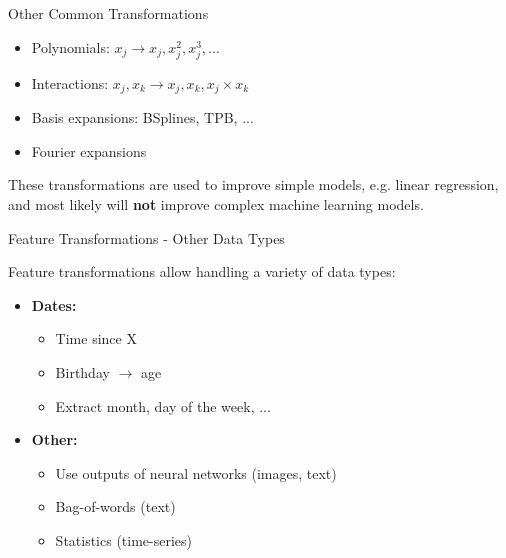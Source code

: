 \documentclass[11pt,compress,t,notes=noshow, xcolor=table]{beamer}
\begin{document}
\begin{vbframe}{Other Common Transformations}

\begin{itemize}
    \item Polynomials: $x_j \longrightarrow x_j, x_j^2, x_j^3, ...$
    \item Interactions: $x_j, x_k \longrightarrow x_j, x_k, x_j \times x_k$
    \item Basis expansions: BSplines, TPB, ...
    \item Fourier expansions
\end{itemize}

\lz

These transformations are used to improve simple models, e.g. linear regression, and most likely will \textbf{not} improve complex machine learning models.

\end{vbframe}

\begin{vbframe}{Feature Transformations - Other Data Types}

Feature transformations allow handling a variety of data types:

\lz

\begin{itemize}
\item \textbf{Dates:}
  \begin{itemize}
  \item Time since X
  \item Birthday $\rightarrow$ age
  \item Extract month, day of the week, ...
  \end{itemize}

\lz

\item \textbf{Other:}
  \begin{itemize}
  \item Use outputs of neural networks (images, text)
  \item Bag-of-words (text)
  \item Statistics (time-series)
  \end{itemize}
\end{itemize}

\end{vbframe}
\end{document}
